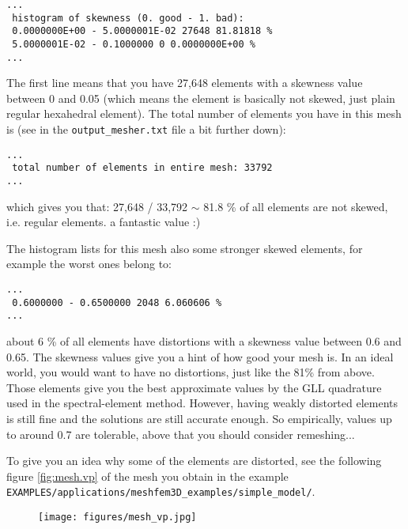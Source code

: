 \begin{description}
{\footnotesize
\begin{verbatim}
...
 histogram of skewness (0. good - 1. bad):
 0.0000000E+00 - 5.0000001E-02 27648 81.81818 %
 5.0000001E-02 - 0.1000000 0 0.0000000E+00 %
...
\end{verbatim}
}

The first line means that you have 27,648 elements with a skewness
value between 0 and 0.05 (which means the element is basically not
skewed, just plain regular hexahedral element). The total number of
elements you have in this mesh is (see in the \texttt{output\_mesher.txt}
file a bit further down):

{\footnotesize
\begin{verbatim}
...
 total number of elements in entire mesh: 33792
...
\end{verbatim}
}

which gives you that: 27,648 / 33,792 $\sim$ 81.8 \% of all elements
are not skewed, i.e. regular elements. a fantastic value :)\newline


The histogram lists for this mesh also some stronger skewed elements,
for example the worst ones belong to:

{\footnotesize
\begin{verbatim}
...
 0.6000000 - 0.6500000 2048 6.060606 %
...

\end{verbatim}
}

about 6 \% of all elements have distortions with a skewness value
between 0.6 and 0.65. The skewness values give you a hint of how good
your mesh is. In an ideal world, you would want to have no distortions,
just like the 81\% from above. Those elements give you the best approximate
values by the GLL quadrature used in the spectral-element method.
However, having weakly distorted elements is still fine and the solutions
are still accurate enough. So empirically, values up to around 0.7
are tolerable, above that you should consider remeshing...\newline


To give you an idea why some of the elements are distorted, see the
following figure \ref{fig:mesh.vp} of the mesh you obtain in the
example \texttt{EXAMPLES/applications/meshfem3D\_examples/simple\_model/}.
\begin{figure}[htbp]
\noindent \begin{centering}
\texttt{[image: figures/mesh\_vp.jpg]}
\par\end{centering}


\end{figure}
\end{description}
